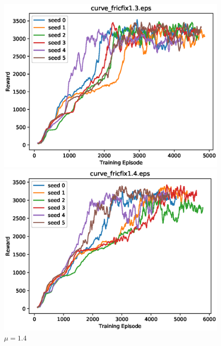 \begin{figure}[p]
 \begin{minipage}{0.49\hsize}
  \begin{center}
 \includegraphics[width=.99\linewidth]{./fig/curve_fricfix1.3.eps}
  \caption{$\mu=1.3$
  }
  \end{center}
 \end{minipage}
 \begin{minipage}{0.49\hsize}
   \begin{center}
 \includegraphics[width=.99\linewidth]{./fig/curve_fricfix1.4.eps}
  \caption{$\mu=1.4$
     }
  \end{center}
 \end{minipage}
\end{figure}

